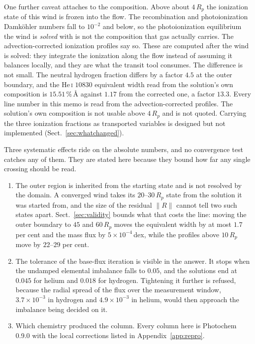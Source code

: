 \documentclass[english,a4paper]{my_memo}
\begin{document}
\medskip
\noindent One further caveat attaches to the composition. Above about
$4\,R_p$ the ionization state of this wind is frozen into the flow. The
recombination and photoionization Damk\"ohler numbers fall to $10^{-2}$ and
below, so the photoionization equilibrium the wind is \emph{solved} with is
not the composition that gas actually carries. The advection-corrected
ionization profiles say so. These are computed after the wind is solved: they
integrate the ionization along the flow instead of assuming it balances
locally, and they are what the transit tool consumes. The difference is not
small. The neutral hydrogen fraction differs by a factor $4.5$ at the outer
boundary, and the He\,\textsc{i} $10830$ equivalent width read from the
solution's own composition is $15.51$\,\%\,\AA{} against $1.17$ from the
corrected one, a factor $13.3$. Every line number in this memo is read from
the advection-corrected profiles. The solution's own composition is not
usable above $4\,R_p$ and is not quoted. Carrying the three ionization
fractions as transported variables is designed but not implemented
(Sect.~\ref{sec:whatchanged}).

\medskip
\noindent Three systematic effects ride on the absolute numbers, and no
convergence test catches any of them. They are stated here because they bound
how far any single crossing should be read.
\begin{enumerate}\itemsep0.2ex
\item The outer region is inherited from the starting state and is not
      resolved by the domain. A converged wind takes its $20$--$30\,R_p$
      state from the solution it was started from, and the size of the
      residual $\|R\|$ cannot tell two such states apart.
      Sect.~\ref{sec:validity} bounds what that costs the line: moving the
      outer boundary to $45$ and $60\,R_p$ moves the equivalent width by at
      most $1.7$ per cent and the mass flux by $5\times10^{-4}$\,dex, while
      the profiles above $10\,R_p$ move by $22$--$29$ per cent.
\item The tolerance of the base-flux iteration is visible in the answer. It
      stops when the undamped elemental imbalance falls to $0.05$, and the
      solutions end at $0.045$ for helium and $0.018$ for hydrogen. Tightening
      it further is refused, because the radial spread of the flux over the
      measurement window, $3.7\times10^{-3}$ in hydrogen and
      $4.9\times10^{-3}$ in helium, would then approach the imbalance being
      decided on it.
\item Which chemistry produced the column. Every column here is
      Photochem 0.9.0 with the local corrections listed in
      Appendix~\ref{app:repro}.
\end{enumerate}
\end{document}
